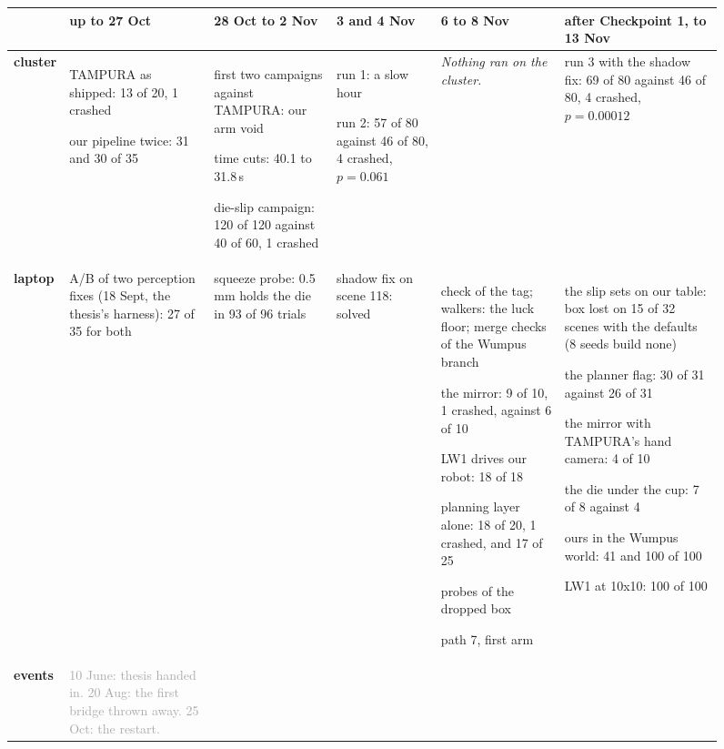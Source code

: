 \begin{figure}[H]
\centering
{\scriptsize\setlength{\tabcolsep}{3pt}\renewcommand{\arraystretch}{1.1}%
\begin{tabularx}{\linewidth}{@{}>{\bfseries}p{0.95cm}*{5}{Y}@{}}
\toprule
 & \textbf{up to 27 Oct} & \textbf{28 Oct to 2 Nov} & \textbf{3 and 4 Nov} & \textbf{6 to 8 Nov} &
   \textbf{after Checkpoint 1, to 13 Nov} \\
\midrule
cluster &
TAMPURA as shipped: 13 of 20, 1 crashed\par {}our pipeline twice: 31 and 30 of 35 &
first two campaigns against TAMPURA: our arm void\par {}time cuts: 40.1 to 31.8\,s\par
{}die-slip campaign: 120 of 120 against 40 of 60, 1 crashed &
run 1: a slow hour\par {}run 2: 57 of 80 against 46 of 80, 4 crashed, $p = 0.061$ &
\emph{Nothing ran on the cluster.} &
run 3 with the shadow fix: 69 of 80 against 46 of 80, 4 crashed, $p = 0.00012$ \\
\midrule
laptop &
A/B of two perception fixes (18 Sept, the thesis's harness): 27 of 35 for both &
squeeze probe: 0.5\,mm holds the die in 93 of 96 trials &
shadow fix on scene 118: solved &
check of the tag; walkers: the luck floor; merge checks of the Wumpus branch\par
{}the mirror: 9 of 10, 1 crashed, against 6 of 10\par {}LW1 drives our robot: 18 of 18\par
{}planning layer alone: 18 of 20, 1 crashed, and 17 of 25\par {}probes of the dropped box\par
{}path 7, first arm &
the slip sets on our table: box lost on 15 of 32 scenes with the defaults (8 seeds build none)\par
{}the planner flag: 30 of 31 against 26 of 31\par
{}the mirror with TAMPURA's hand camera: 4 of 10\par
{}the die under the cup: 7 of 8 against 4\par
{}ours in the Wumpus world: 41 and 100 of 100\par
{}LW1 at 10x10: 100 of 100 \\
\midrule
events &
\textcolor{darkgray}{10 June: thesis handed in. 20 Aug: the first bridge thrown away. 25 Oct: the restart.} &

\end{tabularx}}
\end{figure}
